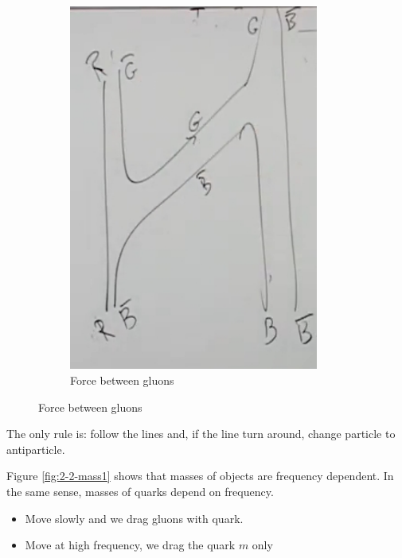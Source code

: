 \documentclass[]{article}
\begin{document}
\begin{figure}[H]
\begin{subfigure}[t]{0.45\textwidth}
	\end{subfigure}
	\hfill
	\begin{subfigure}[t]{0.45\textwidth}
		\caption{Force between gluons}
		\includegraphics[width=0.9\textwidth]{2-2-gluon8}
	\end{subfigure}
\end{figure}

The only rule is: follow the lines and, if the line turn around, change particle to antiparticle.

Figure \ref{fig:2-2-mass1} shows that masses of objects are frequency dependent. In the same sense, masses of quarks depend on frequency.
\begin{itemize}
	\item  Move slowly and we drag gluons with quark.
	\item Move at high frequency, we drag the quark $m$ only
\end{itemize}
\end{document}

